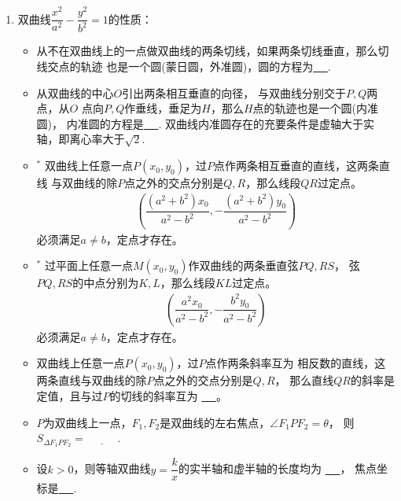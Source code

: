 \documentclass{article}
\newif\ifte
\begin{document}
\begin{multicols}{2}
\begin{enumerate}[leftmargin=20pt]
\begin{itemize}[leftmargin=-4pt]
\end{itemize}

\item 双曲线$ \dfrac{x^2}{a^2}-\dfrac{y^2}{b^2}=1 $的性质：
\begin{itemize}[leftmargin=-4pt]
\item 从不在双曲线上的一点做双曲线的两条切线，如果两条切线垂直，那么切线交点的轨迹
也是一个圆(蒙日圆，外准圆)，圆的方程为\underline{\ \ifte 
    $ x^2+y^2=|a^2-b^2| $ \else \hspace{2cm} \fi\ }.

\item 从双曲线的中心$ O $引出两条相互垂直的向径，
与双曲线分别交于$ P,Q $两点，从$ O $
点向$ P,Q $作垂线，垂足为$ H $，那么$ H $点的轨迹也是一个圆(内准圆)，
内准圆的方程是\underline{\ \ifte $ x^2+y^2=\dfrac{a^2b^2}{b^2-a^2} $
    \else \hspace{2cm} \fi\ }.
双曲线内准圆存在的充要条件是虚轴大于实轴，即离心率大于$ \sqrt{2} $.

\item $^*$ 双曲线上任意一点$ P(x_0,y_0) $，过$ P $点作两条相互垂直的直线，这两条直线
与双曲线的除$ P $点之外的交点分别是$ Q,R $，那么线段$ QR $过定点。
\begin{gather*}
    \left(\dfrac{(a^2+b^2)x_0}{a^2-b^2},-\dfrac{(a^2+b^2)y_0}{a^2-b^2}\right)
\end{gather*}
必须满足$ a\neq b $，定点才存在。

\item $^*$ 过平面上任意一点$ M(x_0,y_0) $作双曲线的两条垂直弦$ PQ,RS $，
弦$ PQ,RS $的中点分别为$ K,L $，那么线段$ KL $过定点。
\begin{gather*}
    \left(\dfrac{a^2x_0}{a^2-b^2},-\dfrac{b^2y_0}{a^2-b^2}\right)
\end{gather*}
必须满足$ a\neq b $，定点才存在。

\item 双曲线上任意一点$ P(x_0,y_0) $，过$ P $点作两条斜率互为
相反数的直线，这两条直线与双曲线的除$ P $点之外的交点分别是$ Q,R $，
那么直线$ QR $的斜率是定值，且与过$ P $的切线的斜率互为
\underline{\ \ifte 相反数\else \hspace{2cm} \fi\ }。

\item $P$为双曲线上一点，$F_1,F_2$是双曲线的左右焦点，$\angle F_1PF_2=\theta $，
则$ S_{\Delta F_1PF_2}=\underline{\ \ifte \dfrac{b^2}{\tan\frac{\theta}{2}} 
    \else \hspace{1cm} \fi\ } $.

\item 设$ k>0 $，则等轴双曲线$ y=\dfrac{k}{x} $的实半轴和虚半轴的长度均为
\underline{\ \ifte $ \sqrt{2k} $\else \hspace{1cm} \fi\ }，
焦点坐标是\underline{\ \ifte $ (\pm\sqrt{2k},\pm\sqrt{2k}) $
    \else \hspace{2cm} \fi\ }.



\end{itemize}
\end{enumerate}
\end{multicols}
\end{document}
